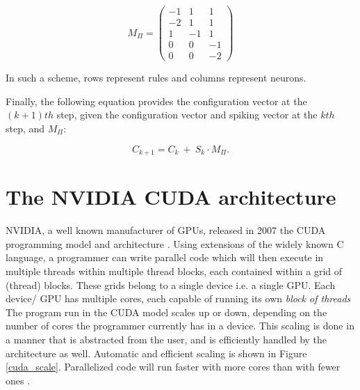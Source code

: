 \documentclass{svmultm}
\begin{document}
\begin{equation}\label{snp_mat}
M_{\Pi} = \left(
\begin{array}{ccc}
  -1 & 1 & 1\\
  -2 & 1 &  1 \\
   1 &  -1 & 1 \\
   0 & 0 & -1\\
   0 & 0& -2
\end{array}\right)
\end{equation}

In such a scheme, rows represent rules and columns
represent neurons. 

Finally, the following equation provides the configuration
vector at the $(k+1)th$ step, given the configuration vector and
spiking vector at the $kth$ step, and $M_{\Pi}$:

\begin{equation}\label{next-config}
C_{k+1} =  C_{k} ~ + ~ S_{k}\cdot M_{\Pi}.
\end{equation}

\section{The NVIDIA CUDA architecture}

NVIDIA, a well known manufacturer of GPUs, released in
2007 the CUDA programming model and architecture \cite{cudapage}.
Using extensions of the widely known C language, a
programmer can write parallel code which will then execute
in multiple threads within multiple thread blocks, each
contained within a grid of (thread) blocks. These grids
belong to a single device i.e. a single  {GPU}. Each
device/ {GPU} has multiple cores, each capable of running
its own \textit{block of threads}
The program run in the CUDA model scales
up or down, depending on the number of cores the
programmer currently has in a device. This scaling is done
in a manner that is abstracted from the user, and is
efficiently handled by the architecture as well. Automatic and efficient scaling is shown
in Figure \ref{cuda_scale}. Parallelized code will run faster with more cores
than with fewer ones \cite{cudaguide}.
\end{document}
